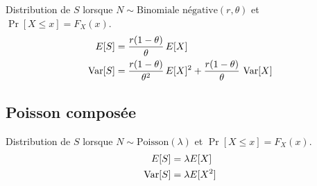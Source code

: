 Distribution de $S$ lorsque $N \sim \text{Binomiale négative}(r,
\theta)$ et $\Pr[X \leq x] = F_X(x)$.
\begin{align*}
  E [ S ] &= \frac{r(1 - \theta)}{\theta}\, E [ X ] \\
  \operatorname{Var} [ S ] &= \frac{r(1 - \theta)}{\theta^2}\, E [ X ]^2 + \frac{r(1 -
    \theta)}{\theta}\, \operatorname{Var} [ X ]
\end{align*}

\subsection{Poisson composée}
\label{distributions:poissoncomposée}

Distribution de $S$ lorsque $N \sim \text{Poisson}(\lambda)$ et $\Pr[X
\leq x] = F_X(x)$.
\begin{align*}
  E [ S ] &= \lambda E [ X ] \\
  \operatorname{Var} [ S ] &= \lambda E [ X^2 ]
\end{align*}

\endgroup

